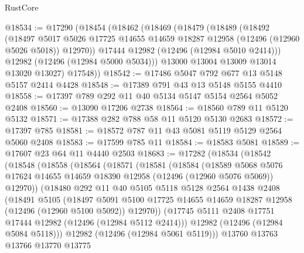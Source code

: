 \begin{lexlean}{RustCore}
\begin{coremodule}
@18534 := @17290
    (@18454
      (@18462
        (@18469
          (@18479
            (@18489
              (@18492
                (@18497
                  @5017
                  @5026
                  @17725
                  @14655
                  @14659
                  @18287
                  @12958
                  (@12496 (@12960 @5026 @5018))
                  @12970))
              @17444
              @12982
              (@12496 (@12984 @5010 @2414)))
            @12982
            (@12496 (@12984 @5000 @5034)))
          @13000
          @13004
          @13009
          @13014
          @13020
          @13027)
        @17548))
@18542 := @17486 @5047 @792 @677 @13 @5148 @5157 @2414 @4428
@18548 := @17389 @791 @43 @13 @5148 @5155 @4410
@18558 := @17397 @789 @292 @11 @40 @5134 @5147 @5154 @2564 @5052 @2408
@18560 := @13090 @17206 @2738
@18564 := @18560 @789 @11 @5120 @5132
@18571 := @17388 @282 @788 @58 @11 @5120 @5130 @2683
@18572 := @17397 @785
@18581 := @18572 @787 @11 @43 @5081 @5119 @5129 @2564 @5060 @2408
@18583 := @17599 @785 @11
@18584 := @18583 @5081
@18589 := @17607 @23 @64 @11 @4440 @2503
@18683 := @17282
    (@18534
      (@18542
        (@18548
          (@18558
            (@18564
              (@18571
                (@18581
                  (@18584
                    (@18589
                      @5068
                      @5076
                      @17624
                      @14655
                      @14659
                      @18390
                      @12958
                      (@12496 (@12960 @5076 @5069))
                      @12970))
                  (@18480
                    @292
                    @11
                    @40
                    @5105
                    @5118
                    @5128
                    @2564
                    @1438
                    @2408
                    (@18491
                      @5105
                      (@18497
                        @5091
                        @5100
                        @17725
                        @14655
                        @14659
                        @18287
                        @12958
                        (@12496 (@12960 @5100 @5092))
                        @12970))
                    (@17745 @5111 @2408 @17751 @17444 @12982 (@12496 (@12984 @5112 @2414)))
                    @12982
                    (@12496 (@12984 @5084 @5118)))
                  @12982
                  (@12496 (@12984 @5061 @5119)))
                @13760
                @13763
                @13766
                @13770
                @13775

\end{coremodule}
\end{lexlean}
